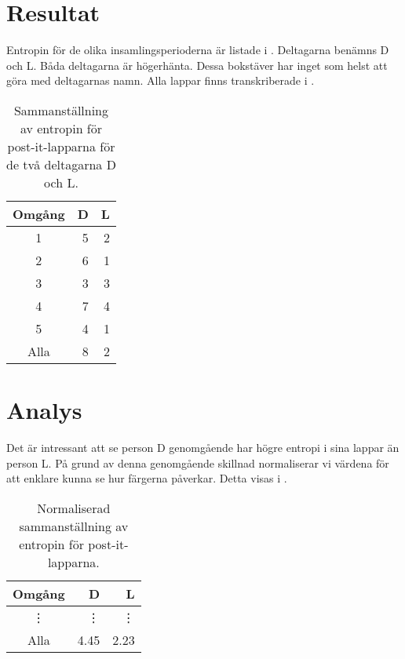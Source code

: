 \section{Resultat}
\label{sec:results}
Entropin för de olika insamlingsperioderna är listade 
i .
Deltagarna benämns D och L.
Båda deltagarna är högerhänta.
Dessa bokstäver har inget som helst att göra med deltagarnas namn.
Alla lappar finns transkriberade i .

\begin{table}
  \centering
  \begin{tabular}{crr}
    \toprule
    \textbf{Omgång} & \textbf{D} & \textbf{L} \\
    \midrule
    1   & 5   & 2 \\
    2   & 6   & 1 \\
    3   & 3   & 3 \\
    4   & 7   & 4 \\
    5   & 4   & 1 \\
    \midrule
    Alla  & 8 & 2 \\
    \bottomrule
  \end{tabular}
  \caption{Sammanställning av entropin för post-it-lapparna för de två 
  deltagarna D och L.}
  \label{tbl:entropy}
\end{table}


\section{Analys}
\label{sec:analysis}
Det är intressant att se person D genomgående har högre entropi i sina lappar 
än person L.
På grund av denna genomgående skillnad normaliserar vi värdena för att enklare 
kunna se hur färgerna påverkar.
Detta visas i .

\begin{table}
  \centering
  \begin{tabular}{c*{2}{D{.}{.}{2}}}
    \toprule
    \textbf{Omgång} & \textbf{D} & \textbf{L} \\
    \midrule
    \vdots  & \vdots  & \vdots \\
    \midrule
    Alla  & 4.45 & 2.23 \\
    \bottomrule
  \end{tabular}
  \caption{Normaliserad sammanställning av entropin för post-it-lapparna.}
  \label{tbl:entropynorm}
\end{table}
